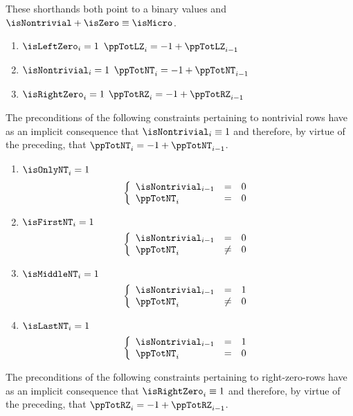 These shorthands both point to a binary values and $\isNontrivial + \isZero \equiv \isMicro$.
\begin{enumerate}[resume]
    \item \If $\isLeftZero    _{i} = 1$ \Then $\ppTotLZ_{i} = - 1 + \ppTotLZ_{i - 1}$
    \item \If $\isNontrivial  _{i} = 1$ \Then $\ppTotNT_{i} = - 1 + \ppTotNT_{i - 1}$
    \item \If $\isRightZero   _{i} = 1$ \Then $\ppTotRZ_{i} = - 1 + \ppTotRZ_{i - 1}$
\end{enumerate}
\saNote{} The preconditions of the following constraints pertaining to nontrivial rows have as an implicit consequence that $\isNontrivial_{i} \equiv 1$ and therefore, by virtue of the preceding, that $\ppTotNT_{i} = - 1 + \ppTotNT_{i - 1}$.
\begin{enumerate}[resume]
    \item \If $\isOnlyNT      _{i} = 1$ \Then
	\[
	    \left\{ \begin{array}{lcl}
		\isNontrivial_{i - 1} & = & 0 \\
		\ppTotNT_{i    }      & = & 0 \\
	    \end{array} \right.
	\]
    \item \If $\isFirstNT     _{i} = 1$ \Then
	\[
	    \left\{ \begin{array}{lclr}
		\isNontrivial_{i - 1} & =    & 0 \\
		\ppTotNT_{i    }      & \neq & 0 \\
	    \end{array} \right.
	\]
    \item \If $\isMiddleNT    _{i} = 1$ \Then
	\[
	    \left\{ \begin{array}{lcl}
		\isNontrivial_{i - 1} & =    & 1 \\
		\ppTotNT     _{i    }      & \neq & 0  \\
	    \end{array} \right.
	\]
    \item \If $\isLastNT      _{i} = 1$ \Then
	\[
	    \left\{ \begin{array}{lcl}
		\isNontrivial_{i - 1} & = & 1 \\
		\ppTotNT_{i    }      & = & 0 \\
	    \end{array} \right.
	\]
\end{enumerate}
\saNote{} The preconditions of the following constraints pertaining to right-zero-rows have as an implicit consequence that $\isRightZero_{i} \equiv 1$ and therefore, by virtue of the preceding, that $\ppTotRZ_{i} = - 1 + \ppTotRZ_{i - 1}$.
